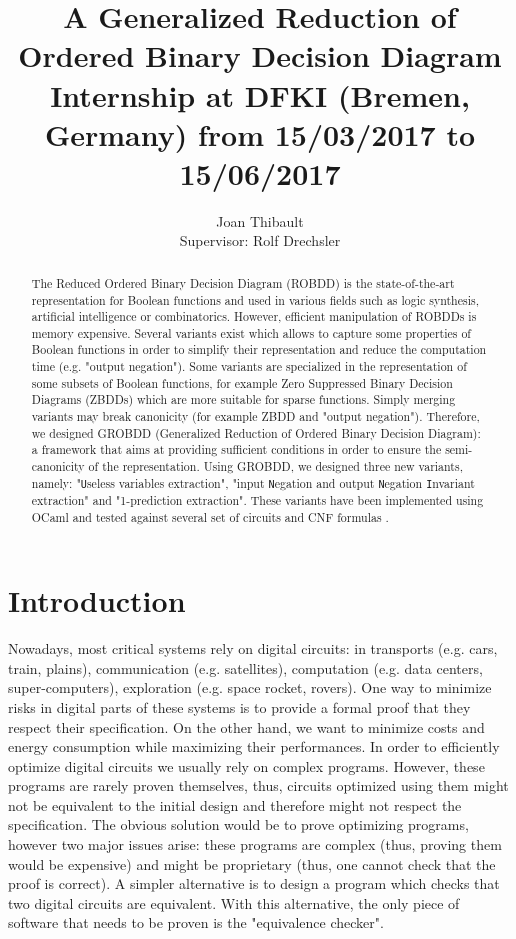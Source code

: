 \documentclass[a4paper,10pt]{article}
\title{A Generalized Reduction of Ordered Binary Decision Diagram\\{\small Internship at DFKI (Bremen, Germany) from 15/03/2017 to 15/06/2017}}
\author{Joan Thibault\\Supervisor: Rolf Drechsler}
\newcommand{\Uextract}{"\texttt{U}seless variables extraction"}
\newcommand{\NNIextract}{"input \texttt{N}egation and output \texttt{N}egation \texttt{I}nvariant extraction"}
\newcommand{\Xextract}{"1-prediction extraction"}
\begin{document}
\maketitle
\begin{abstract}
The Reduced Ordered Binary Decision Diagram (ROBDD)\cite{Bryant1986, Somenzi1999} is the state-of-the-art representation for Boolean functions and used in various fields such as logic synthesis, artificial intelligence or combinatorics.
However, efficient manipulation of ROBDDs is memory expensive.
Several variants exist which allows to capture some properties of Boolean functions in order to simplify their representation and reduce the computation time (e.g. "output negation").
Some variants are specialized in the representation of some subsets of Boolean functions, for example Zero Suppressed Binary Decision Diagrams (ZBDDs) which are more suitable for sparse functions.
Simply merging variants may break canonicity (for example ZBDD and "output negation").
Therefore, we designed GROBDD (Generalized Reduction of Ordered Binary Decision Diagram): a framework that aims at providing sufficient conditions in order to ensure the semi-canonicity of the representation.
Using GROBDD, we designed three new variants, namely: \Uextract{}, \NNIextract{} and \Xextract{}.
These variants have been implemented using OCaml \cite{DAGamlGitHub} and tested against several set of circuits \cite{BenchIscas99, BenchLgsynth91} and CNF formulas \cite{BenchSatlib}.
\end{abstract}

\newpage

\section{Introduction}

Nowadays, most critical systems rely on digital circuits: in transports (e.g. cars, train, plains), communication (e.g. satellites), computation (e.g. data centers, super-computers), exploration (e.g. space rocket, rovers).
One way to minimize risks in digital parts of these systems is to provide a formal proof that they respect their specification.
On the other hand, we want to minimize costs and energy consumption while maximizing their performances.
In order to efficiently optimize digital circuits we usually rely on complex programs.
However, these programs are rarely proven themselves, thus, circuits optimized using them might not be equivalent to the initial design and therefore might not respect the specification.
The obvious solution would be to prove optimizing programs, however two major issues arise: these programs are complex (thus, proving them would be expensive) and might be proprietary (thus, one cannot check that the proof is correct).
A simpler alternative is to design a program which checks that two digital circuits are equivalent.
With this alternative, the only piece of software that needs to be proven is the "equivalence checker".
\end{document}
